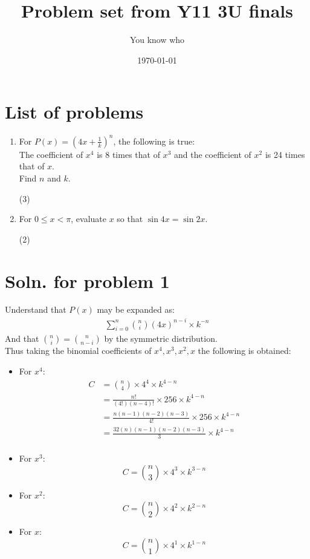 \documentclass[12pt]{article}
\author{\normalsize You know who}
\title{\huge Problem set from Y11 3U finals}
\date{\today}
\begin{document}
\maketitle
\section*{List of problems}
\large

\begin{enumerate}
	\item For $P(x) = (4x + \frac{1}{k})^n$, the following is true: \\
	      The coefficient of $x^4$ is 8 times that of $x^3$ and the coefficient of $x^2$ is 24 times that of $x$. \\
	      Find $n$ and $k$. \begin{flushright} (3) \end{flushright}

	\item For $0\leq x<\pi$, evaluate $x$ so that $\sin{4x} = \sin{2x}$. \begin{flushright} (2) \end{flushright}
\end{enumerate}

\newpage

\section*{Soln. for problem 1}
\large

Understand that $P(x)$ may be expanded as:
\begin{align*}
	\displaystyle\sum_{i=0}^{n}{\binom{n}{i} (4x)^{n-i} \times k^{-n}}
\end{align*}
And that $\binom{n}{i} = \binom{n}{n-i}$ by the symmetric distribution. \\
Thus taking the binomial coefficients of $x^4, x^3, x^2, x$ the following is obtained:
\begin{itemize}
	\item For $x^4$:
	      \begin{align*}
          C &= \binom{n}{4} \times 4^4 \times k^{4-n} \\
            &= \frac{n!}{(4!)(n-4)!} \times 256 \times k^{4-n} \\
            &= \frac{n(n-1)(n-2)(n-3)}{4!} \times 256 \times k^{4-n} \\
            &= \frac{32(n)(n-1)(n-2)(n-3)}{3} \times k^{4-n} \\
	      \end{align*}

	\item For $x^3$:
	      \[
		      C = \binom{n}{3} \times 4^3 \times k^{3-n}
	      \]

	\item For $x^2$:
	      \[
		      C = \binom{n}{2} \times 4^2 \times k^{2-n}
	      \]
	\item For $x$:
	      \[
		      C = \binom{n}{1} \times 4^1 \times k^{1-n}
	      \]
\end{itemize}
\end{document}
